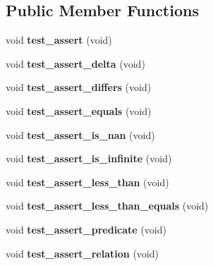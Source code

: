 \subsection*{Public Member Functions}
\begin{DoxyCompactItemize}
\item 
\hypertarget{classTest_a85d5cae5bee91f97478e38657f418dfa}{void {\bfseries test\-\_\-assert} (void)}\label{classTest_a85d5cae5bee91f97478e38657f418dfa}

\item 
\hypertarget{classTest_a2eba5864a4770379d8a66e25fe1705fd}{void {\bfseries test\-\_\-assert\-\_\-delta} (void)}\label{classTest_a2eba5864a4770379d8a66e25fe1705fd}

\item 
\hypertarget{classTest_a3d3f6057928b9a53ebab237b1db31f1a}{void {\bfseries test\-\_\-assert\-\_\-differs} (void)}\label{classTest_a3d3f6057928b9a53ebab237b1db31f1a}

\item 
\hypertarget{classTest_ae66bdf3f3e620cd69b1484bab776aed0}{void {\bfseries test\-\_\-assert\-\_\-equals} (void)}\label{classTest_ae66bdf3f3e620cd69b1484bab776aed0}

\item 
\hypertarget{classTest_a531e3e96bf86cffc212ef7052dc3adb4}{void {\bfseries test\-\_\-assert\-\_\-is\-\_\-nan} (void)}\label{classTest_a531e3e96bf86cffc212ef7052dc3adb4}

\item 
\hypertarget{classTest_a70520f1f7cb191d51baa8d89ec634c1e}{void {\bfseries test\-\_\-assert\-\_\-is\-\_\-infinite} (void)}\label{classTest_a70520f1f7cb191d51baa8d89ec634c1e}

\item 
\hypertarget{classTest_ad6a3e464819b27bd7ffb0dc488d8f88e}{void {\bfseries test\-\_\-assert\-\_\-less\-\_\-than} (void)}\label{classTest_ad6a3e464819b27bd7ffb0dc488d8f88e}

\item 
\hypertarget{classTest_a1656c044f633809285e8a5e93326eb8c}{void {\bfseries test\-\_\-assert\-\_\-less\-\_\-than\-\_\-equals} (void)}\label{classTest_a1656c044f633809285e8a5e93326eb8c}

\item 
\hypertarget{classTest_a4748f1b83df4a5695ec84c32b2639502}{void {\bfseries test\-\_\-assert\-\_\-predicate} (void)}\label{classTest_a4748f1b83df4a5695ec84c32b2639502}

\item 
\hypertarget{classTest_a399359d20dc2d353f6377577030d9ff2}{void {\bfseries test\-\_\-assert\-\_\-relation} (void)}\label{classTest_a399359d20dc2d353f6377577030d9ff2}


\end{DoxyCompactItemize}
